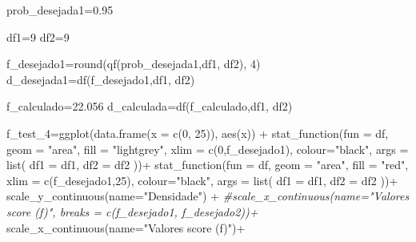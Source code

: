 \documentclass[
]{book}
\newenvironment{Shaded}{\begin{snugshade}}{\end{snugshade}}
\newcommand{\AttributeTok}[1]{\textcolor[rgb]{0.77,0.63,0.00}{#1}}
\newcommand{\CommentTok}[1]{\textcolor[rgb]{0.56,0.35,0.01}{\textit{#1}}}
\newcommand{\DecValTok}[1]{\textcolor[rgb]{0.00,0.00,0.81}{#1}}
\newcommand{\FloatTok}[1]{\textcolor[rgb]{0.00,0.00,0.81}{#1}}
\newcommand{\FunctionTok}[1]{\textcolor[rgb]{0.00,0.00,0.00}{#1}}
\newcommand{\NormalTok}[1]{#1}
\newcommand{\OtherTok}[1]{\textcolor[rgb]{0.56,0.35,0.01}{#1}}
\newcommand{\SpecialCharTok}[1]{\textcolor[rgb]{0.00,0.00,0.00}{#1}}
\newcommand{\StringTok}[1]{\textcolor[rgb]{0.31,0.60,0.02}{#1}}
\begin{document}
\begin{Shaded}
\begin{Highlighting}[]
\NormalTok{prob\_desejada1}\OtherTok{=}\FloatTok{0.95}

\NormalTok{df1}\OtherTok{=}\DecValTok{9}
\NormalTok{df2}\OtherTok{=}\DecValTok{9}  

\NormalTok{f\_desejado1}\OtherTok{=}\FunctionTok{round}\NormalTok{(}\FunctionTok{qf}\NormalTok{(prob\_desejada1,df1, df2), }\DecValTok{4}\NormalTok{)}
\NormalTok{d\_desejada1}\OtherTok{=}\FunctionTok{df}\NormalTok{(f\_desejado1,df1, df2)}

\NormalTok{f\_calculado}\OtherTok{=}\FloatTok{22.056}
\NormalTok{d\_calculada}\OtherTok{=}\FunctionTok{df}\NormalTok{(f\_calculado,df1, df2)}


\NormalTok{f\_test\_4}\OtherTok{=}\FunctionTok{ggplot}\NormalTok{(}\FunctionTok{data.frame}\NormalTok{(}\AttributeTok{x =} \FunctionTok{c}\NormalTok{(}\DecValTok{0}\NormalTok{, }\DecValTok{25}\NormalTok{)), }\FunctionTok{aes}\NormalTok{(x)) }\SpecialCharTok{+}
  \FunctionTok{stat\_function}\NormalTok{(}\AttributeTok{fun =}\NormalTok{ df,}
                \AttributeTok{geom =} \StringTok{"area"}\NormalTok{,}
                \AttributeTok{fill =} \StringTok{"lightgrey"}\NormalTok{,}
                \AttributeTok{xlim =} \FunctionTok{c}\NormalTok{(}\DecValTok{0}\NormalTok{,f\_desejado1),}
                \AttributeTok{colour=}\StringTok{"black"}\NormalTok{,}
                \AttributeTok{args =} \FunctionTok{list}\NormalTok{(}
                  \AttributeTok{df1 =}\NormalTok{ df1,}
                  \AttributeTok{df2 =}\NormalTok{ df2}
\NormalTok{                ))}\SpecialCharTok{+}
  \FunctionTok{stat\_function}\NormalTok{(}\AttributeTok{fun =}\NormalTok{ df,}
                \AttributeTok{geom =} \StringTok{"area"}\NormalTok{,}
                \AttributeTok{fill =} \StringTok{"red"}\NormalTok{,}
                \AttributeTok{xlim =} \FunctionTok{c}\NormalTok{(f\_desejado1,}\DecValTok{25}\NormalTok{),}
                \AttributeTok{colour=}\StringTok{"black"}\NormalTok{,}
                \AttributeTok{args =} \FunctionTok{list}\NormalTok{(}
                  \AttributeTok{df1 =}\NormalTok{ df1,}
                  \AttributeTok{df2 =}\NormalTok{ df2}
\NormalTok{                ))}\SpecialCharTok{+}
  \FunctionTok{scale\_y\_continuous}\NormalTok{(}\AttributeTok{name=}\StringTok{"Densidade"}\NormalTok{) }\SpecialCharTok{+}
  \CommentTok{\#scale\_x\_continuous(name="Valores score (f)", breaks = c(f\_desejado1, f\_desejado2))+  }
  \FunctionTok{scale\_x\_continuous}\NormalTok{(}\AttributeTok{name=}\StringTok{"Valores score (f)"}\NormalTok{)}\SpecialCharTok{+}  

\end{Highlighting}
\end{Shaded}
\end{document}
